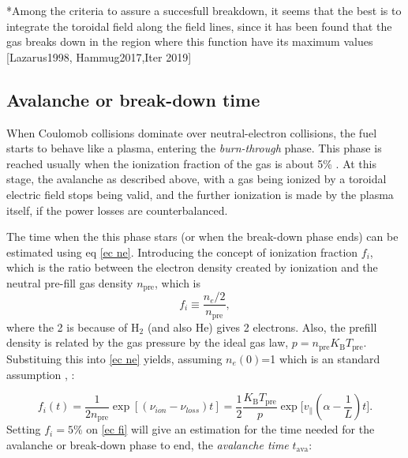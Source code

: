 \documentclass[a4paper,12pt,oneside]{book}
\begin{document}
*Among the criteria to assure a succesfull breakdown, it seems that the best is to integrate the toroidal field along the field lines, since it has been found that the gas breaks down in the region where this function have its maximum values [Lazarus1998, Hammug2017,Iter 2019]

\subsection{Avalanche or break-down time}

When Coulomob collisions dominate over neutral-electron collisions, the fuel starts to behave like a plasma, entering the \textit{burn-through} phase. This phase is reached usually when the ionization fraction of the gas is about 5\% \cite{ITER_2019}. At this stage, the avalanche as described above, with a gas being ionized by a toroidal electric field stops being valid, and the further ionization is made by the plasma itself, if the power losses are counterbalanced. 

The time when the this phase stars (or when the break-down phase ends) can be estimated using eq \eqref{ec ne}. Introducing the concept of ionization fraction $f_i$, which is the ratio between the electron density created by ionization and the neutral pre-fill gas density $n_\text{pre}$, which is
\begin{equation}
f_i \equiv \dfrac{n_e/2}{n_\text{pre}},
\end{equation} 
where the 2 is because of H$_2$ (and also He) gives 2 electrons. Also, the prefill density is related by the gas pressure by the ideal gas law, $p=n_\text{pre} K_\text{B} T_\text{pre}$. Substituing this into \eqref{ec ne} yields, assuming $n_e(0)$=1 which is an standard assumption \cite{ITER_2019}, \cite{Lloyd_1991}:

\begin{equation}\label{ec fi}
f_i(t)=\dfrac{1}{2 n_\text{pre}} \exp{ [(\nu_{ion}-\nu_{loss})t]}= \dfrac{1}{2} \dfrac{K_\text{B} T_\text{pre}}{p} \exp \Big[v_\parallel (\alpha-\dfrac{1}{L})t \Big].
\end{equation}
Setting $f_i=5\%$ on \eqref{ec fi} will give an estimation for the time needed for the avalanche or break-down phase to end, the \textit{avalanche time} $t_\text{ava}$:
\end{document}
